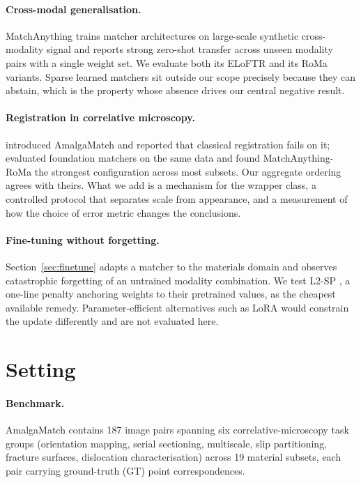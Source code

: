 \documentclass[10pt]{article}
\begin{document}
\paragraph{Cross-modal generalisation.} MatchAnything \citep{he2025matchanything} trains matcher architectures on large-scale synthetic cross-modality signal and reports strong zero-shot transfer across unseen modality pairs with a single weight set. We evaluate both its ELoFTR and its RoMa variants. Sparse learned matchers \citep{sarlin2020superglue,lindenberger2023lightglue} sit outside our scope precisely because they can abstain, which is the property whose absence drives our central negative result.

\paragraph{Registration in correlative microscopy.} \citet{durmaz2026amalgamatch} introduced AmalgaMatch and reported that classical registration fails on it; \citet{durmaz2026foundation} evaluated foundation matchers on the same data and found MatchAnything-RoMa the strongest configuration across most subsets. Our aggregate ordering agrees with theirs. What we add is a mechanism for the wrapper class, a controlled protocol that separates scale from appearance, and a measurement of how the choice of error metric changes the conclusions.

\paragraph{Fine-tuning without forgetting.} Section~\ref{sec:finetune} adapts a matcher to the materials domain and observes catastrophic forgetting \citep{kirkpatrick2017ewc} of an untrained modality combination. We test L2-SP \citep{li2018l2sp}, a one-line penalty anchoring weights to their pretrained values, as the cheapest available remedy. Parameter-efficient alternatives such as LoRA \citep{hu2022lora} would constrain the update differently and are not evaluated here.

\section{Setting}
\label{sec:setting}

\paragraph{Benchmark.} AmalgaMatch \citep{durmaz2026amalgamatch} contains 187 image pairs spanning six correlative-microscopy task groups (orientation mapping, serial sectioning, multiscale, slip partitioning, fracture surfaces, dislocation characterisation) across 19 material subsets, each pair carrying ground-truth (GT) point correspondences.
\end{document}
